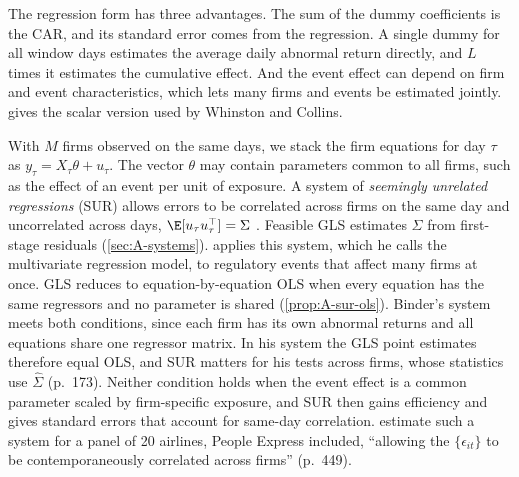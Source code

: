 The regression form has three advantages. The sum of the dummy coefficients is the CAR, and its standard error comes
from the regression. A single dummy for all window days estimates the average daily abnormal return directly, and
$L$ times it estimates the cumulative effect. And the event effect can depend on firm and event characteristics,
which lets many firms and events be estimated jointly.  gives the scalar version used by
Whinston and Collins.

With $M$ firms observed on the same days, we stack the firm equations for day $\tau$ as
$y_\tau=X_\tau\theta+u_\tau$. The vector $\theta$ may contain parameters common to all firms, such as the effect of an
event per unit of exposure. A
system of \emph{seemingly unrelated regressions} (SUR) allows errors to be correlated across firms on the same day
and uncorrelated across days, $\E[u_\tau u_\tau^\top]=\Sigma$ \citep{Zellner1962}. Feasible GLS estimates $\Sigma$
from first-stage residuals (\cref{sec:A-systems}). \citet[pp.~170--173]{Binder1985} applies this system, which he calls
the multivariate regression model, to regulatory events that affect many firms at once.
GLS reduces to equation-by-equation OLS when every equation has the
same regressors and no parameter is shared (\cref{prop:A-sur-ols}). Binder's system meets both conditions, since each
firm has its own abnormal returns and all equations share one regressor matrix. In his system the GLS point estimates
therefore equal OLS, and SUR matters for his tests across firms, whose statistics use $\hat\Sigma$ (p.~173). Neither condition holds when the event effect is
a common parameter scaled by firm-specific exposure, and SUR then gains efficiency and gives standard errors that
account for same-day correlation. \citet{WhinstonCollins1992} estimate such a system for a panel of 20 airlines,
People Express included, ``allowing the $\{\epsilon_{it}\}$ to be contemporaneously correlated across firms''
(p.~449).

